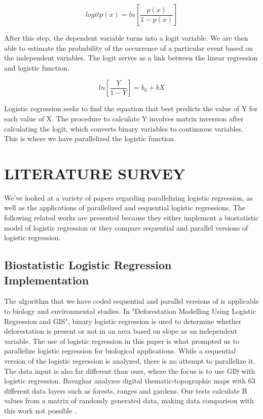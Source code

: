 \documentclass[letterpaper, 10 pt, conference]{ieeeconf}  %
\begin{document}
$$logit p(x) = ln[\frac{p(x)}{1-p(x)}]$$

After this step, the dependent variable turns into a logit variable. We are then able to estimate the probability of the occurrence of a particular event based on the independent variables. The logit serves as a link between the linear regression and logistic function.

$$ln[\frac{Y}{1-Y}] = b_0 + bX$$

Logistic regression seeks to find the equation that best predicts the value of Y for each value of X. The procedure to calculate Y involves matrix inversion after calculating the logit, which converts binary variables to continuous variables. This is where we have parallelized the logistic function.






\section{LITERATURE SURVEY}
We've looked at a variety of papers regarding parallelizing logistic regression, as well as the applications of parallelized and sequential logistic regressions. The following related works are presented because they either implement a biostatistic model of logistic regression or they compare sequential and parallel versions of logistic regression. 

\subsection{Biostatistic Logistic Regression Implementation}
The algorithm that we have coded sequential and parallel versions of is applicable to biology and environmental studies. In "Deforestation Modelling Using Logistic Regression and GIS", binary logistic regression is used to determine whether deforestation is present or not in an area based on slope as an independent variable. The use of logistic regression in this paper is what prompted us to parallelize logistic regression for biological applications. While a sequential version of the logistic regression is analyzed, there is no attempt to parallelize it. The data input is also far different than ours, where the focus is to use GIS with logistic regression. Bavaghar analyzes digital thematic-topographic maps with 63 different data layers such as forests, ranges and gardens. Our tests calculate B values from a matrix of randomly generated data, making data comparison with this work not possible \cite{c1}.
\end{document}
